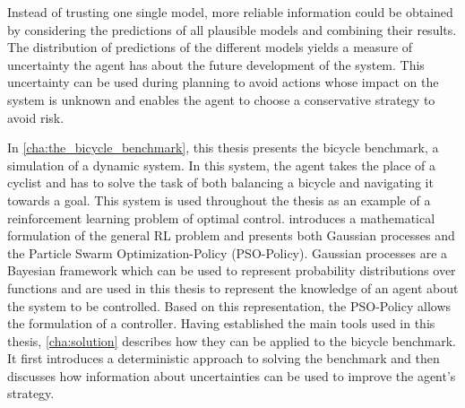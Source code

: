 Instead of trusting one single model, more reliable information could be obtained by considering the predictions of all plausible models and combining their results.
The distribution of predictions of the different models yields a measure of uncertainty the agent has about the future development of the system.
This uncertainty can be used during planning to avoid actions whose impact on the system is unknown and enables the agent to choose a conservative strategy to avoid risk.

In \cref{cha:the_bicycle_benchmark}, this thesis presents the bicycle benchmark, a simulation of a dynamic system.
In this system, the agent takes the place of a cyclist and has to solve the task of both balancing a bicycle and navigating it towards a goal.
This system is used throughout the thesis as an example of a reinforcement learning problem of optimal control.
 introduces a mathematical formulation of the general RL problem and presents both Gaussian processes and the Particle Swarm Optimization-Policy (PSO-Policy).
Gaussian processes are a Bayesian framework which can be used to represent probability distributions over functions and are used in this thesis to represent the knowledge of an agent about the system to be controlled.
Based on this representation, the PSO-Policy allows the formulation of a controller.
Having established the main tools used in this thesis, \cref{cha:solution} describes how they can be applied to the bicycle benchmark.
It first introduces a deterministic approach to solving the benchmark and then discusses how information about uncertainties can be used to improve the agent's strategy.
